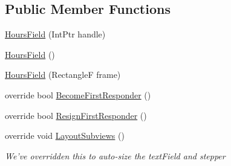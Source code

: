 \subsection*{Public Member Functions}
\begin{DoxyCompactItemize}
\item 
\hyperlink{class_field_service_1_1i_o_s_1_1_hours_field_aa32e94b37587c04d42fee2d8cd6a5c8c}{Hours\+Field} (Int\+Ptr handle)
\item 
\hyperlink{class_field_service_1_1i_o_s_1_1_hours_field_a93bdf6e6d852f5466906cbf82d603d84}{Hours\+Field} ()
\item 
\hyperlink{class_field_service_1_1i_o_s_1_1_hours_field_a6b2059472bacae0e5f1348d342f93ff1}{Hours\+Field} (Rectangle\+F frame)
\item 
override bool \hyperlink{class_field_service_1_1i_o_s_1_1_hours_field_aecf4b98f69c8a6e58b9460e0e3748543}{Become\+First\+Responder} ()
\item 
override bool \hyperlink{class_field_service_1_1i_o_s_1_1_hours_field_aff34f627519f4766c645be0fc3e656da}{Resign\+First\+Responder} ()
\item 
override void \hyperlink{class_field_service_1_1i_o_s_1_1_hours_field_a7254b8ebc13d2e879a0c3600d8833ff9}{Layout\+Subviews} ()
\begin{DoxyCompactList}\small\item\em We've overridden this to auto-\/size the text\+Field and stepper \end{DoxyCompactList}\end{DoxyCompactItemize}
